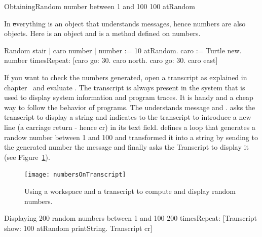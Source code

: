 \begin{scriptwithtitle}{ObtainingRandom number between 1 and 100}\label{scr:nbaleatoire}
100 atRandom
\end{scriptwithtitle}

\begin{teacher}
In \st everything is an object that understands messages, hence numbers are also objects. Here  is an object and  is a method defined on numbers.  
\end{teacher}

\begin{scriptwithtitle}{Random stair}\label{scr:random}
| caro number | 
number := 10 atRandom. 
caro := Turtle new.
number timesRepeat: 
       [caro go: 30.
       caro north.
       caro go: 30.
       caro east]
\end{scriptwithtitle}

\begin{teacher}
If you want to check the numbers generated, open a transcript as explained in chapter~ and evaluate . The transcript is always present in the system that is used to display system information and program traces. It is handy and a cheap way to follow the behavior of programs.
The  understands  message   and .   asks the transcript  to display a string and  indicates to the transcript to introduce a new line (a carriage return - hence cr)  in its text field.  defines a loop that generates a randow number between 1 and 100 and transformed it into a string by sending to the   generated number the message  and finally asks the Transcript to display it (see Figure~\ref{fig:usertroismarchesontr}). 
\end{teacher}

\begin{figure}[!htbp]
\centerline{\texttt{[image: numbersOnTranscript]}}
\caption{Using a workspace and a transcript to compute and display random numbers.
\label{fig:usertroismarchesontr}}
\end{figure}

\begin{scriptwithtitle}{Displaying 200 random numbers between 1 and 100}\label{scr:nbaleatoires}
200 timesRepeat: 
   [Transcript  show: 100 atRandom printString. 
   Transcript cr]
\end{scriptwithtitle}




